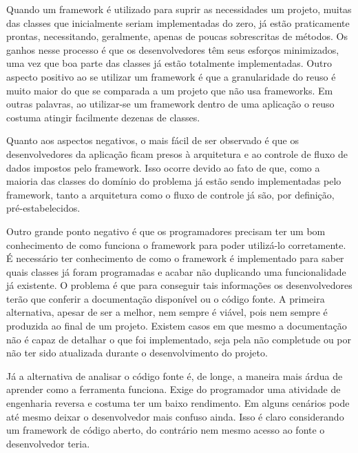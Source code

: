 \documentclass[
    12pt,       %
    openright,      %
    twoside,      %
    a4paper,      %
    english,      %
    french,       %
    spanish,      %
    brazil,       %
    ]{abntex2}
\begin{document}
          Quando um framework é utilizado para suprir as necessidades um projeto, muitas
          das classes que inicialmente seriam implementadas do zero, já estão praticamente
          prontas, necessitando, geralmente, apenas de poucas sobrescritas de métodos.
          Os ganhos nesse processo é que os desenvolvedores têm seus esforços
          minimizados, uma vez que boa parte das classes já estão totalmente implementadas.
          Outro aspecto positivo ao se utilizar um framework é que a granularidade do
          reuso é muito maior do que se comparada a um projeto que não usa frameworks.
          Em outras palavras, ao utilizar-se um framework dentro de uma aplicação o reuso
          costuma atingir facilmente dezenas de classes.

          Quanto aos aspectos negativos, o mais fácil de ser observado é que os
          desenvolvedores da aplicação ficam presos à arquitetura e ao controle
          de fluxo de dados impostos pelo framework. Isso ocorre devido ao fato de que, como a
          maioria das classes do domínio do problema já estão sendo implementadas pelo
          framework, tanto a arquitetura como o fluxo de controle já são, por
          definição, pré-estabelecidos.

          Outro grande ponto negativo é que os programadores precisam ter um bom conhecimento
          de como funciona o framework para poder utilizá-lo corretamente. É necessário
          ter conhecimento de como o framework é implementado para saber quais classes
          já foram programadas e acabar não duplicando uma funcionalidade já existente.
          O problema é que para conseguir tais informações os desenvolvedores terão que
          conferir a documentação disponível ou o código fonte. A primeira alternativa,
          apesar de ser a melhor, nem sempre é viável, pois nem sempre é produzida ao
          final de um projeto. Existem casos em que mesmo a documentação não é capaz
          de detalhar o que foi implementado, seja pela não completude ou por não ter
          sido atualizada durante o desenvolvimento do projeto.

          Já a alternativa de analisar o código fonte é, de longe, a maneira mais árdua
          de aprender como a ferramenta funciona. Exige do programador uma atividade
          de engenharia reversa e costuma ter um baixo rendimento. Em alguns cenários
          pode até mesmo deixar o desenvolvedor mais confuso ainda. Isso é claro
          considerando um framework de código aberto, do contrário nem mesmo acesso
          ao fonte o desenvolvedor teria.
\end{document}
